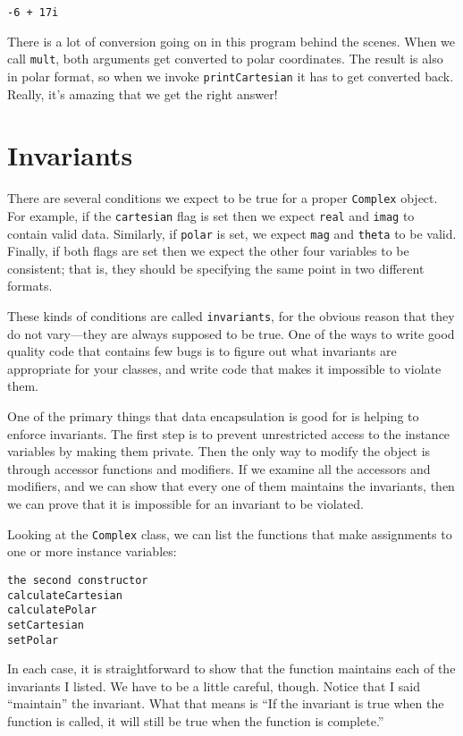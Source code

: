 \begin{verbatim}
-6 + 17i
\end{verbatim}
%
There is a lot of conversion going on in this program behind the
scenes.  When we call {\tt mult}, both arguments get converted to
polar coordinates.  The result is also in polar format, so when we
invoke {\tt printCartesian} it has to get converted back.  Really,
it's amazing that we get the right answer!


\section{Invariants}

There are several conditions we expect to be true for a proper
{\tt Complex} object.  For example, if the {\tt cartesian} flag
is set then we expect {\tt real} and {\tt imag} to contain valid
data.  Similarly, if {\tt polar} is set, we expect {\tt mag}
and {\tt theta} to be valid.  Finally, if both flags are set
then we expect the other four variables to be consistent;
that is, they should be specifying the same point in two different
formats.

These kinds of conditions are called {\tt invariants}, for the obvious
reason that they do not vary---they are always supposed to be true.
One of the ways to write good quality code that contains few bugs
is to figure out what invariants are appropriate for your classes,
and write code that makes it impossible to violate them.


One of the primary things that data encapsulation is good for
is helping to enforce invariants.  The first step is to prevent
unrestricted access to the instance variables by making them
private.  Then the only way to modify the object is through
accessor functions and modifiers.  If we examine all the accessors
and modifiers, and we can show that every one of them maintains
the invariants, then we can prove that it is impossible for
an invariant to be violated.

Looking at the {\tt Complex} class, we can list the functions
that make assignments to one or more instance variables:

\begin{verbatim}
the second constructor
calculateCartesian
calculatePolar
setCartesian
setPolar
\end{verbatim}
%
In each case, it is straightforward to show that the function
maintains each of the invariants I listed.  We have to be a little
careful, though.  Notice that I said ``maintain'' the invariant.
What that means is ``If the invariant is true when the function
is called, it will still be true when the function is complete.''

